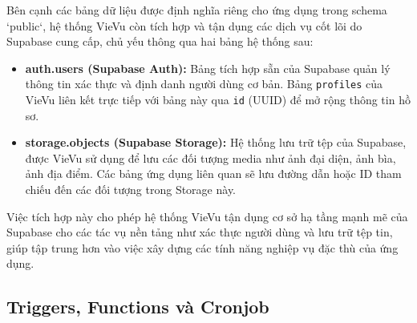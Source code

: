 Bên cạnh các bảng dữ liệu được định nghĩa riêng cho ứng dụng trong schema `public`, hệ thống VieVu còn tích hợp và tận dụng các dịch vụ cốt lõi do Supabase cung cấp, chủ yếu thông qua hai bảng hệ thống sau:
\begin{itemize}
    \item \textbf{auth.users (Supabase Auth):} Bảng tích hợp sẵn của Supabase quản lý thông tin xác thực và định danh người dùng cơ bản. Bảng \texttt{profiles} của VieVu liên kết trực tiếp với bảng này qua \texttt{id} (UUID) để mở rộng thông tin hồ sơ.

    \item \textbf{storage.objects (Supabase Storage):} Hệ thống lưu trữ tệp của Supabase, được VieVu sử dụng để lưu các đối tượng media như ảnh đại diện, ảnh bìa, ảnh địa điểm. Các bảng ứng dụng liên quan sẽ lưu đường dẫn hoặc ID tham chiếu đến các đối tượng trong Storage này.


\end{itemize}
Việc tích hợp này cho phép hệ thống VieVu tận dụng cơ sở hạ tầng mạnh mẽ của Supabase cho các tác vụ nền tảng như xác thực người dùng và lưu trữ tệp tin, giúp tập trung hơn vào việc xây dựng các tính năng nghiệp vụ đặc thù của ứng dụng.

\subsection{Triggers, Functions và Cronjob}

